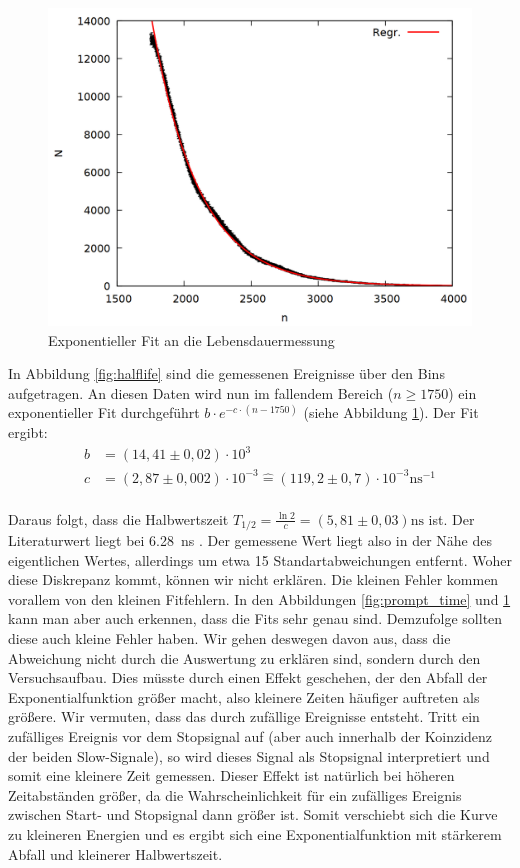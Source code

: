 \begin{figure}
\centering
\includegraphics[width=0.7\linewidth]{data/uebernacht2.png}
\caption{Exponentieller Fit an die Lebensdauermessung}
\label{fig:halflife2}
\end{figure}

In Abbildung \ref{fig:halflife} sind die gemessenen Ereignisse über den Bins aufgetragen. An diesen Daten wird nun im fallendem Bereich ($n \geq 1750$) ein exponentieller Fit durchgeführt $b\cdot e^{-c\cdot (n-1750)}$ (siehe Abbildung \ref{fig:halflife2}). Der Fit ergibt:
\begin{align*}
b &= (14,41 \pm 0,02) \cdot 10^3\\
c &= (2,87 \pm 0,002) \cdot 10^{-3} \mathrel{\widehat{=}} (119,2 \pm 0,7)\cdot 10^{-3} \si{\nano\second}^{-1}\\
\end{align*}

Daraus folgt, dass die Halbwertszeit $T_{1/2} = \frac{\ln{2}}{c} = (5,81 \pm 0,03) \si{\nano\second}$ ist. Der Literaturwert liegt bei \SI{6,28}{\nano\second} \cite{cs133}. Der gemessene Wert liegt also in der Nähe des eigentlichen Wertes, allerdings um etwa 15 Standartabweichungen entfernt. Woher diese Diskrepanz kommt, können wir nicht erklären. Die kleinen Fehler kommen vorallem von den kleinen Fitfehlern. In den Abbildungen \ref{fig:prompt_time} und \ref{fig:halflife2} kann man aber auch erkennen, dass die Fits sehr genau sind. Demzufolge sollten diese auch kleine Fehler haben. Wir gehen deswegen davon aus, dass die Abweichung nicht durch die Auswertung zu erklären sind, sondern durch den Versuchsaufbau. Dies müsste durch einen Effekt geschehen, der den Abfall der Exponentialfunktion größer macht, also kleinere Zeiten häufiger auftreten als größere. Wir vermuten, dass das durch zufällige Ereignisse entsteht. Tritt ein zufälliges Ereignis vor dem Stopsignal auf (aber auch innerhalb der Koinzidenz der beiden Slow-Signale), so wird dieses Signal als Stopsignal interpretiert und somit eine kleinere Zeit gemessen. Dieser Effekt ist natürlich bei höheren Zeitabständen größer, da die Wahrscheinlichkeit für ein zufälliges Ereignis zwischen Start- und Stopsignal dann größer ist. Somit verschiebt sich die Kurve zu kleineren Energien und es ergibt sich eine Exponentialfunktion mit stärkerem Abfall und kleinerer Halbwertszeit. 